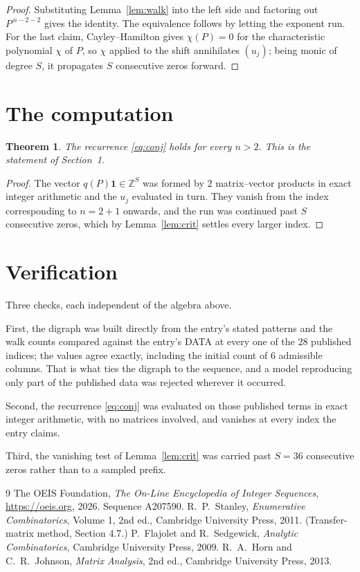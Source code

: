 \documentclass[11pt,a4paper]{article}
\theoremstyle{plain}
\newtheorem{theorem}{Theorem}
\theoremstyle{definition}
\begin{document}
\begin{proof}
Substituting Lemma~\ref{lem:walk} into the left side and factoring out
$P^{\,n-2-2}$ gives the identity. The equivalence follows by letting the exponent
run. For the last claim, Cayley--Hamilton gives $\chi(P)=0$ for the characteristic
polynomial $\chi$ of $P$, so $\chi$ applied to the shift annihilates $(u_j)$; being monic of
degree $S$, it propagates $S$ consecutive zeros forward.
\end{proof}

\section{The computation}

\begin{theorem}
The recurrence \eqref{eq:conj} holds for every $n>2$. This is the statement of
Section~1.
\end{theorem}

\begin{proof}
The vector $q(P)\mathbf{1}\in\mathbb{Z}^{S}$ was formed by $2$ matrix--vector
products in exact integer arithmetic and the $u_j$ evaluated in turn. They vanish from the
index corresponding to $n=2+1$ onwards, and the run was continued past $S$ consecutive
zeros, which by Lemma~\ref{lem:crit} settles every larger index.
\end{proof}

\section{Verification}

Three checks, each independent of the algebra above.

First, the digraph was built directly from the entry's stated patterns and the walk counts
compared against the entry's DATA at every one of the $28$ published indices; the
values agree exactly, including the initial count of $6$ admissible columns. That is
what ties the digraph to the sequence, and a model reproducing only part of the published
data was rejected wherever it occurred.

Second, the recurrence \eqref{eq:conj} was evaluated on those published terms in exact
integer arithmetic, with no matrices involved, and vanishes at every index the entry claims.

Third, the vanishing test of Lemma~\ref{lem:crit} was carried past $S=36$ consecutive
zeros rather than to a sampled prefix.

\begin{thebibliography}{9}
 The OEIS Foundation, \emph{The On-Line Encyclopedia of Integer
Sequences}, \url{https://oeis.org}, 2026. Sequence A207590.
 R.~P.~Stanley, \emph{Enumerative Combinatorics}, Volume 1, 2nd ed.,
Cambridge University Press, 2011. (Transfer-matrix method, Section 4.7.)
 P.~Flajolet and R.~Sedgewick, \emph{Analytic Combinatorics}, Cambridge
University Press, 2009.
 R.~A.~Horn and C.~R.~Johnson, \emph{Matrix Analysis}, 2nd ed., Cambridge
University Press, 2013.
\end{thebibliography}
\end{document}
